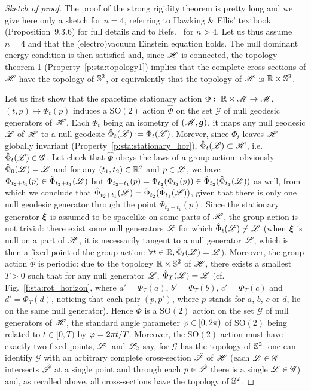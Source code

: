 \begin{proof}[Sketch of proof]
The proof of the strong rigidity theorem is pretty long and we
give here only a sketch for $n=4$, referring to Hawking \& Ellis' textbook~\cite{HawkiE73} (Proposition~9.3.6)
for full details and to Refs.~\cite{HollaIW07,HollaI12,MoncrI08}
for $n>4$.
Let us thus assume $n=4$ and that the (electro)vacuum Einstein equation holds.
The null dominant energy condition is then satisfied and, since
$\mathscr{H}$ is connected, the topology theorem 1 (Property~\ref{p:sta:topology1})
implies that the complete cross-sections of $\mathscr{H}$ have the topology of $\mathbb{S}^2$,
or equivalently that the topology of $\mathscr{H}$ is $\mathbb{R}\times\mathbb{S}^2$.

Let us first show that the
spacetime stationary action $\Phi:\  \mathbb{R}\times \mathscr{M} \to \mathscr{M}$, $(t,p) \mapsto \Phi_t(p)$
induces a $\mathrm{SO}(2)$ action $\hat{\Phi}$ on the set $\mathscr{G}$ of
null geodesic generators of $\mathscr{H}$.
Each $\Phi_t$ being an isometry of $(\mathscr{M},\bm{g})$,
it maps any null geodesic $\mathscr{L}$ of $\mathscr{H}$ to a null geodesic $\hat{\Phi}_t(\mathscr{L}):= \Phi_t(\mathscr{L})$.
Morever, since $\Phi_t$ leaves $\mathscr{H}$ globally invariant (Property~\ref{p:sta:stationary_hor}),
$\hat{\Phi}_t(\mathscr{L})\subset\mathscr{H}$, i.e. $\hat{\Phi}_t(\mathscr{L})\in\mathscr{G}$.
Let check that $\hat{\Phi}$ obeys the laws of a group action:
obviously $\hat{\Phi}_0(\mathscr{L}) = \mathscr{L}$ and for any $(t_1, t_2)\in \mathbb{R}^2$
and $p\in\mathscr{L}$, we have
$\Phi_{t_2 + t_1}(p)\in\hat{\Phi}_{t_2+t_1}(\mathscr{L})$ but
$\Phi_{t_2 + t_1}(p) = \Phi_{t_2}(\Phi_{t_1}(p)) \in \hat{\Phi}_{t_2}(\hat{\Phi}_{t_1}(\mathscr{L}))$
as well,
from which we conclude that $\hat{\Phi}_{t_2+t_1}(\mathscr{L}) = \hat{\Phi}_{t_2}(\hat{\Phi}_{t_1}(\mathscr{L}))$,
given that there is only one null geodesic generator through the point $\Phi_{t_2 + t_1}(p)$.
Since the stationary generator $\bm{\xi}$ is assumed to be spacelike on some parts
of $\mathscr{H}$, the group action is not trivial: there exist some null generators $\mathscr{L}$ for which
$\hat{\Phi}_t(\mathscr{L})\neq \mathscr{L}$ (when $\bm{\xi}$ is null on a part of $\mathscr{H}$, it is necessarily
tangent to a null generator $\mathscr{L}$, which is then a fixed point of the group action:
$\forall t\in\mathbb{R}, \hat{\Phi}_t(\mathscr{L}) = \mathscr{L}$).
Moreover, the group action $\hat{\Phi}$ is periodic: due to the topology
$\mathbb{R}\times\mathbb{S}^2$ of $\mathscr{H}$,
there exists a smallest $T>0$
such that for any null generator $\mathscr{L}$, $\hat{\Phi}_T(\mathscr{L}) = \mathscr{L}$
(cf. Fig.~\ref{f:sta:rot_horizon}, where $a' = \Phi_T(a)$,
$b' = \Phi_T(b)$, $c' = \Phi_T(c)$ and $d' = \Phi_T(d)$, noticing that
each pair $(p,p')$, where $p$ stands for $a$, $b$, $c$ or $d$,
lie on the same null generator). Hence $\hat{\Phi}$ is
a $\mathrm{SO}(2)$ action on the set $\mathscr{G}$
of null generators of $\mathscr{H}$, the standard angle parameter $\varphi\in[0,2\pi)$ %
of $\mathrm{SO}(2)$ being related to $t\in [0,T)$ by $\varphi = 2\pi t / T$. %
Moreover, the $\mathrm{SO}(2)$ action must have exactly two fixed points,
$\mathscr{L}_1$ and $\mathscr{L}_2$ say,
for $\mathscr{G}$ has the topology of $\mathbb{S}^2$: one
can identify $\mathscr{G}$ with an arbitrary complete cross-section $\hat{\mathscr{S}}$
of $\mathscr{H}$ (each $\mathscr{L}\in\mathscr{G}$ intersects $\hat{\mathscr{S}}$ at a single
point and through each $p\in\hat{\mathscr{S}}$ there is a single $\mathscr{L}\in\mathscr{G}$)
and, as recalled above, all cross-sections have the topology of $\mathbb{S}^2$.


\end{proof}
